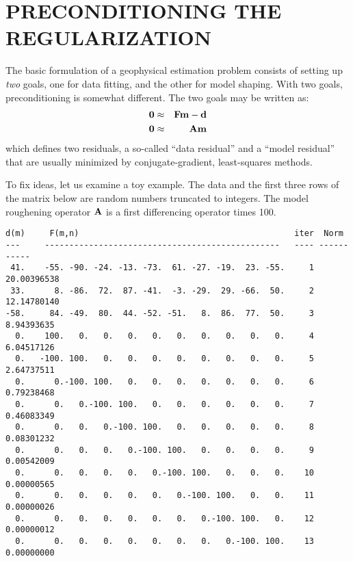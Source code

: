 \section{PRECONDITIONING THE REGULARIZATION}


\par
The basic formulation of a geophysical estimation problem
consists of setting up
{\em  two}
goals,
one for data fitting,
and the other for model shaping.
With two goals, preconditioning is somewhat different.
The two goals may be written as:
\begin{eqnarray}
\bold 0 &\approx& \bold F \bold m - \bold d \\
\bold 0 &\approx& \bold A \bold m
\end{eqnarray}
which defines two residuals,
a so-called ``data residual'' and a ``model residual'' that
are usually minimized by conjugate-gradient, least-squares methods.
\par
To fix ideas, let us examine a toy example.
The data and the first three rows of the matrix below
are random numbers truncated to integers.
The model roughening operator $\bold A$
is a first differencing operator times 100.

{\samepage
\par\noindent
\footnotesize
\begin{verbatim}
d(m)     F(m,n)                                            iter  Norm
---     ------------------------------------------------   ---- -----------
 41.    -55. -90. -24. -13. -73.  61. -27. -19.  23. -55.     1 20.00396538
 33.      8. -86.  72.  87. -41.  -3. -29.  29. -66.  50.     2 12.14780140
-58.     84. -49.  80.  44. -52. -51.   8.  86.  77.  50.     3  8.94393635
  0.    100.   0.   0.   0.   0.   0.   0.   0.   0.   0.     4  6.04517126
  0.   -100. 100.   0.   0.   0.   0.   0.   0.   0.   0.     5  2.64737511
  0.      0.-100. 100.   0.   0.   0.   0.   0.   0.   0.     6  0.79238468
  0.      0.   0.-100. 100.   0.   0.   0.   0.   0.   0.     7  0.46083349
  0.      0.   0.   0.-100. 100.   0.   0.   0.   0.   0.     8  0.08301232
  0.      0.   0.   0.   0.-100. 100.   0.   0.   0.   0.     9  0.00542009
  0.      0.   0.   0.   0.   0.-100. 100.   0.   0.   0.    10  0.00000565
  0.      0.   0.   0.   0.   0.   0.-100. 100.   0.   0.    11  0.00000026
  0.      0.   0.   0.   0.   0.   0.   0.-100. 100.   0.    12  0.00000012
  0.      0.   0.   0.   0.   0.   0.   0.   0.-100. 100.    13  0.00000000
\end{verbatim}
}
\normalsize

